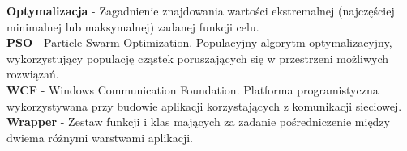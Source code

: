 \documentclass[12pt, twoside, openany, abstract=on]{report}
\theoremstyle{definition}
\begin{document}
\textbf{Optymalizacja} - Zagadnienie znajdowania wartości ekstremalnej (najczęściej minimalnej lub maksymalnej) zadanej funkcji celu.\\
\textbf{PSO} - Particle Swarm Optimization. Populacyjny algorytm optymalizacyjny, wykorzystujący populację cząstek poruszających się w przestrzeni możliwych rozwiązań.\\
\textbf{WCF} - Windows Communication Foundation. Platforma programistyczna wykorzystywana przy budowie aplikacji korzystających z komunikacji sieciowej.\\
\textbf{Wrapper} - Zestaw funkcji i klas mających za zadanie pośredniczenie między dwiema różnymi warstwami aplikacji.\\


\end{document}
